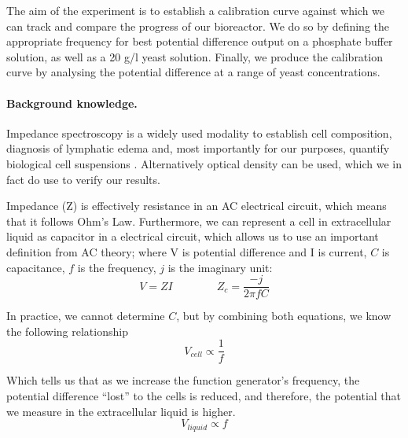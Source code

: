
The aim of the experiment is to establish a calibration curve against which we can track and compare the progress of our bioreactor.
We do so by defining the appropriate frequency for best potential difference output on a phosphate buffer solution, as well as a 20 g/l yeast solution.
Finally, we produce the calibration curve by analysing the potential difference at a range of yeast concentrations.  

\paragraph{Background knowledge.}
Impedance spectroscopy is a widely used modality to establish cell composition, diagnosis of lymphatic edema and, most importantly for our purposes, quantify biological cell suspensions \cite{LvovichVadimF2012Is, PolatAyfer2017EDoL}.
Alternatively optical density can be used, which we in fact do use to verify our results.

Impedance (Z) is effectively resistance in an AC electrical circuit, which means that it follows Ohm's Law.
Furthermore, we can represent a cell in extracellular liquid as capacitor in a electrical circuit, which allows us to use an important definition from AC theory; where V is potential difference and I is current, $C$ is capacitance, $f$ is the frequency, $j$ is the imaginary unit:
\begin{equation}
    V = ZI \quad \quad \quad \quad Z_c = \frac{-j}{2\pi f C}
\end{equation}

In practice, we cannot determine $C$, but by combining both equations, we know the following relationship
\begin{equation}
   V_{cell} \propto \frac{1}{f}
\end{equation}

Which tells us that as we increase the function generator's frequency, the potential difference ``lost'' to the cells is reduced, and therefore, the potential that we measure in the extracellular liquid is higher.
\begin{equation}
    V_{liquid} \propto f
 \end{equation}